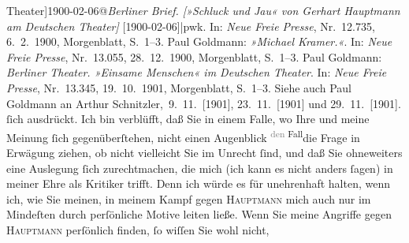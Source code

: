 \begin{ledgroupsized}[t]{13cm}
{{{{                  Theater]1900-02-06@\strich\emph{Berliner Brief. [»Schluck und Jau« von Gerhart Hauptmann am Deutschen Theater]} {[}1900-02-06{]}|pwk}. In: \emph{Neue Freie Presse}, Nr. 12.735, 6. 2. 1900, Morgenblatt, S. 1–3. Paul Goldmann: \emph{»Michael Kramer.«}. In: \emph{Neue Freie Presse}, Nr. 13.055, 28. 12. 1900, Morgenblatt, S. 1–3. Paul Goldmann: \emph{Berliner Theater. »Einsame Menschen« im Deutschen Theater}.
                     In: \emph{Neue Freie Presse}, Nr. 13.345, 19. 10. 1901, Morgenblatt, S. 1–3. Siehe
                  auch Paul Goldmann an Arthur Schnitzler, 9. 11. [1901], 23. 11. [1901] und 29. 11. [1901].}}}\label{K_L03535-2h} ſich {\pb}ausdrückt. Ich bin verblüfft, daß Sie in einem
               Falle, wo Ihre und meine Meinung ſich gegenüberſtehen, nicht einen Augenblick \substVorne{}\textsuperscript{\textcolor{gray}{den} Fall}{\allowbreak}\substDazwischen{}die Frage\substHinten{} in Erwägung ziehen, ob nicht vielleicht Sie im Unrecht ſind, und daß Sie
               ohneweiters eine Auslegung ſich zurechtmachen, die mich (ich kann es nicht anders
               ſagen) in meiner  Ehre als Kritiker trifft. Denn ich würde es für
               unehrenhaft halten, wenn ich, wie Sie meinen, in meinem Kampf gegen \textsc{Hauptmann} mich auch nur im Mindeſten durch perſönliche Motive leiten ließe. Wenn Sie
               meine Angriffe gegen \textsc{Hauptmann} perſönlich {\pb}finden, ſo wiſſen Sie wohl nicht,

\end{ledgroupsized}
